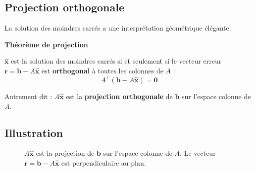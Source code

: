 \documentclass[12pt,a4paper]{article}
\newcommand{\T}{^\top}
\begin{document}
\subsection{Projection orthogonale}

La solution des moindres carrés a une interprétation géométrique élégante.

\begin{theorembox}
\textbf{Théorème de projection}

$\hat{\mathbf{x}}$ est la solution des moindres carrés si et seulement si le vecteur erreur $\mathbf{r} = \mathbf{b} - A\hat{\mathbf{x}}$ est \textbf{orthogonal} à toutes les colonnes de $A$ :
\begin{equation}
A\T (\mathbf{b} - A\hat{\mathbf{x}}) = \mathbf{0}
\end{equation}

Autrement dit : $A\hat{\mathbf{x}}$ est la \textbf{projection orthogonale} de $\mathbf{b}$ sur l'espace colonne de $A$.
\end{theorembox}

\subsection{Illustration}

\begin{figure}[H]
\centering
{}
\caption{$A\hat{\mathbf{x}}$ est la projection de $\mathbf{b}$ sur l'espace colonne de $A$. Le vecteur $\mathbf{r} = \mathbf{b} - A\hat{\mathbf{x}}$ est perpendiculaire au plan.}
\end{figure}
\end{document}
